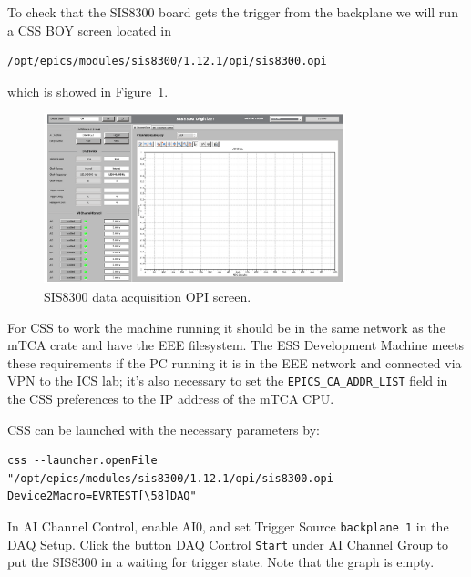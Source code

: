 \documentclass[11pt
  , a4paper
  , article
  , oneside
  , showtrims
]{memoir}
\begin{document}
To check that the SIS8300 board gets the trigger from the backplane we will run a CSS BOY screen located in
\begin{lstlisting}[style=termstyle]
/opt/epics/modules/sis8300/1.12.1/opi/sis8300.opi
\end{lstlisting}
which is showed in Figure~\ref{fig:OPI}.
\begin{figure}[!htb]
  \centering
    \includegraphics[width=0.78\textwidth]{./pictures/sis8300-digitizer-opi.eps}
  \caption{SIS8300 data acquisition OPI screen.}
  \label{fig:OPI}
\end{figure}

For CSS to work the machine running it should be in the same network as the mTCA crate and have the EEE filesystem. The ESS Development Machine meets these requirements if the PC running it is in the EEE network and connected via VPN to the ICS lab; it's also necessary to set the \texttt{EPICS\_CA\_ADDR\_LIST} field in the CSS preferences to the IP address of the mTCA CPU.

CSS can be launched with the necessary parameters by:
\begin{lstlisting}[style=termstyle]
css --launcher.openFile "/opt/epics/modules/sis8300/1.12.1/opi/sis8300.opi Device2Macro=EVRTEST[\58]DAQ"
\end{lstlisting}

In AI Channel Control, enable AI0, and set Trigger Source \texttt{backplane 1} in the DAQ Setup. Click the button DAQ Control \texttt{Start} under AI Channel Group to put the SIS8300 in a waiting for trigger state. Note that the graph is empty.
\end{document}
